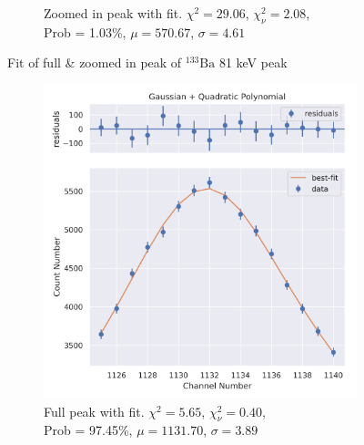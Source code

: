 \documentclass[11pt,a4paper]{article}
\newcommand{\element}[2]{$^{#2}\textrm{#1}$}
\begin{document}
\begin{figure}[H]
\begin{subfigure}{.5\linewidth}
    \caption{Zoomed in peak with fit. $\chi^2 = 29.06$, $\chi^2_\nu = 2.08$, \\ Prob = 1.03\%, $\mu = 570.67$, $\sigma = 4.61$}
  \end{subfigure}
  \caption{Fit of full \& zoomed in peak of \element{Ba}{133} 81 keV peak}
\end{figure}
\begin{figure}[H]
  \centering
  \begin{subfigure}{.5\linewidth}
    \centering
    \includegraphics[width=\linewidth]{./Images/Barium133/Quad/Quad_2_Full.png}
    \caption{Full peak with fit. $\chi^2 = 5.65$, $\chi^2_\nu = 0.40$, \\ Prob = 97.45\%, $\mu = 1131.70$, $\sigma = 3.89$}
  \end{subfigure}%
  \begin{subfigure}{.5\linewidth}
    \centering

\end{subfigure}
\end{figure}
\end{document}
